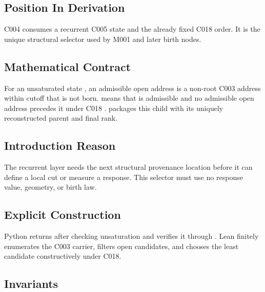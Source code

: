 \subsection{Position In Derivation}\label{position-in-derivation-12}

C004 consumes a recurrent C005 state and the already fixed C018 order.
It is the unique structural selector used by M001 and later birth nodes.

\subsection{Mathematical Contract}\label{mathematical-contract-6}

For an unsaturated state \texttt{\protect{}}, an admissible open address is a
non-root C003 address within cutoff that is not born.
\texttt{\protect{}} means that \texttt{\protect{}} is admissible and
no admissible open address precedes it under C018 \texttt{\protect{}}.
\texttt{\protect{}} packages this child with its uniquely
reconstructed parent and final rank.

\subsection{Introduction Reason}\label{introduction-reason-15}

The recurrent layer needs the next structural provenance location before
it can define a local cut or measure a response. This selector must use
no response value, geometry, or birth law.

\subsection{Explicit Construction}\label{explicit-construction-6}

Python returns \texttt{\protect{}}
after checking unsaturation and verifies it through
\texttt{\protect{}}. Lean finitely enumerates the
C003 carrier, filters open candidates, and chooses the least candidate
constructively under C018.

\subsection{Invariants}\label{invariants-6}


